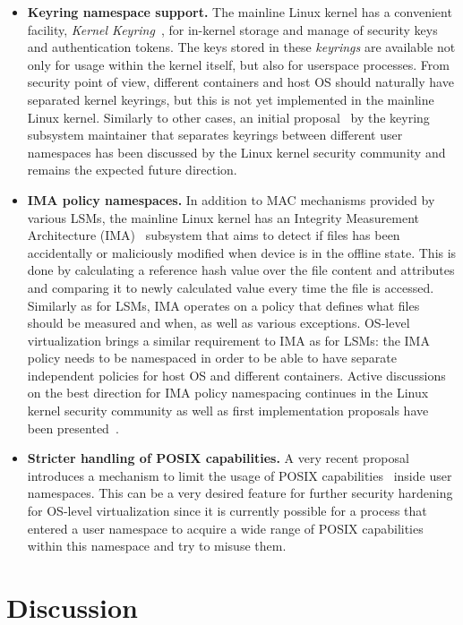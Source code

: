 \begin{itemize}
  \item \textbf{Keyring namespace support.} The mainline Linux kernel has a convenient facility, \textit{Kernel Keyring}~\cite{keyrings}, for in-kernel storage and manage of security keys and authentication tokens. The keys stored in these \textit{keyrings} are available not only for usage within the kernel itself, but also for userspace processes. From security point of view, different containers and host OS should naturally have separated kernel keyrings, but this is not yet implemented in the mainline Linux kernel. Similarly to other cases, an initial proposal~\cite{howells2016} by the keyring subsystem maintainer that separates keyrings between different user namespaces has been discussed by the Linux kernel security community and remains the expected future direction. 
	\item \textbf{IMA policy namespaces.} In addition to MAC mechanisms provided by various LSMs, the mainline Linux kernel has an Integrity Measurement Architecture (IMA)~\cite{ima} subsystem that aims to detect if files has been accidentally or maliciously modified when device is in the offline state. This is done by calculating a reference hash value over the file content and attributes and comparing it to newly calculated value every time the file is accessed. Similarly as for LSMs, IMA operates on a policy that defines what files should be measured and when, as well as various exceptions. OS-level virtualization brings a similar requirement to IMA as for LSMs: the IMA policy needs to be namespaced in order to be able to have separate independent policies for host OS and different containers. Active discussions on the best direction for IMA policy namespacing continues in the Linux kernel security community as well as first implementation proposals have been presented~\cite{magalhaes2017}. 
	\item \textbf{Stricter handling of POSIX capabilities.} A very recent proposal~\cite{Bandewar2017} introduces a mechanism to limit the usage of POSIX capabilities~\cite{caps} inside user namespaces. This can be a very desired feature for further security hardening for OS-level virtualization since it is currently possible for a process that entered a user namespace to acquire a wide range of POSIX capabilities within this namespace and try to misuse them. 
\end{itemize}


\section{Discussion}

